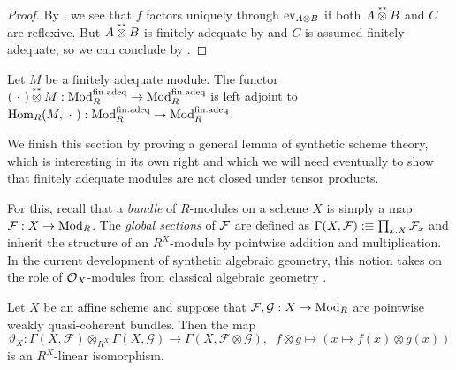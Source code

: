 \begin{proof}
  By , we see that $f$ factors uniquely through $\mathrm{ev}_{A \otimes B}$ if both $A \dbldualtensor B$ and $C$ are reflexive. But $A \dbldualtensor B$ is finitely adequate by  and $C$ is assumed finitely adequate, so we can conclude by .
\end{proof}

\begin{corollary}\label{cor:dbl-dual-tensor-adjunction}
  Let $M$ be a finitely adequate module.
  The functor $(\argmhole) \dbldualtensor M : \finadeq \to \finadeq$ is left adjoint to $\mathrm{Hom}_R(M,\ \cdot\ ) : \textup{Mod}_{R}^{\mathrm{fin.adeq}} \to \textup{Mod}_{R}^{\mathrm{fin.adeq}}$. \earlyqed
\end{corollary}

We finish this section by proving a general lemma of synthetic scheme theory, which is interesting in its own right and which we will need eventually to show that finitely adequate modules are not closed under tensor products.

For this, recall that a \emph{bundle} of $R$-modules on a scheme $X$ is simply a map $\mathcal{F} : X \to \textup{Mod}_{R}$.
The \emph{global sections} of $\mathcal{F}$ are defined as $\Gamma(X,\mathcal{F}) :\equiv \prod_{x:X}\mathcal{F}_x$ and inherit the structure of an $R^X$-module by pointwise addition and multiplication.
In the current development of synthetic algebraic geometry, this notion takes on the role of $\mathcal{O}_X$-modules from classical algebraic geometry \cite[Chapter 7]{draft}.

\begin{lemma}
  \label{tensor-gamma-commute-on-affines}
  Let $X$ be an affine scheme and suppose that $\mathcal F, \mathcal G : X \to \textup{Mod}_{R}$ are pointwise weakly quasi-coherent bundles.
  Then the map
  \[
    \vartheta_X : \Gamma(X,\mathcal F) \otimes_{R^X}\Gamma(X,\mathcal G) \to \Gamma(X,\mathcal F \otimes \mathcal G), \;\;
    f \otimes g \mapsto (x \mapsto f(x) \otimes g(x))
  \]
  is an $R^X$-linear isomorphism.
\end{lemma}


